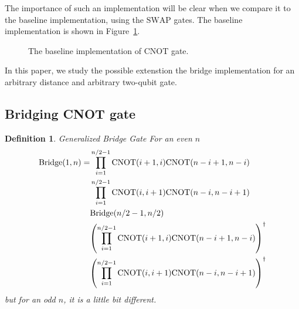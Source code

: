 \documentclass{report}
\newtheorem{definition}{Definition}
\begin{document}

The importance of such an implementation will be clear when we compare it to the baseline implementation, using the $\mathrm{SWAP}$ gates. The baseline implementation is shown in Figure~\ref{fig:3_baseline_impl}.

\begin{figure}[h]
  \centering
  \label{fig:3_baseline_impl}
  \caption{The baseline implementation of $\mathrm{CNOT}$ gate.}
\end{figure}

In this paper, we study the possible extenstion the bridge implementation for an arbitrary distance and arbitrary two-qubit gate.

\subsection*{Bridging CNOT gate}

\def\qceq{\midstick[6,brackets=none]{=}}
  \begin{definition}{Generalized Bridge Gate}
    For an even $n$
    \begin{align*} \mathrm{Bridge}(1, n) = &\prod_{i=1}^{n/2 - 1}\mathrm{CNOT}(i + 1, i)\mathrm{CNOT}(n - i + 1, n - i) \\ & \prod_{i=1}^{n/2 - 1}\mathrm{CNOT}(i, i + 1)\mathrm{CNOT}(n - i, n - i + 1) \\ & \mathrm{Bridge}(n/2 - 1, n/2)  \\
    & \qty(\prod_{i=1}^{n/2 - 1}\mathrm{CNOT}(i + 1, i)\mathrm{CNOT}(n - i + 1, n - i))^\dagger \\ 
    & \qty(\prod_{i=1}^{n/2 - 1}\mathrm{CNOT}(i, i + 1)\mathrm{CNOT}(n - i, n - i + 1))^\dagger
    \end{align*}
    but for an odd $n$, it is a little bit different.
  \end{definition}
\end{document}

